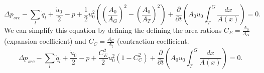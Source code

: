 \documentclass[superscriptaddress, onecolumn, prl]{revtex4}
\begin{document}
\begin{equation}
\label{eq:energy4}
\Delta p_{src} -\sum_l{\dot{q}_l} + \frac{\dot{u}_0}{2} - p + \frac{1}{2} u_{0}^2 \left( \left( \frac{A_{0}}{A_{G}} \right)^2- \left( \frac{A_{0}}{A_{T}} \right)^2 \right) + \frac{\partial}{\partial t} \left( A_{0} u_{0} \int_{T}^{G} \frac{dx}{A(x)} \right) = 0.
\end{equation}
We can simplify this equation by defining the defining the area rations $C_E = \frac{A_{0}}{A_{G}}$ (expansion coefficient) and $C_C = \frac{A_G}{A_t}$ (contraction coefficient.
\begin{equation}
\label{eq:energy5}
\Delta p_{src}-\sum_l{\dot{q}_l} + \frac{\dot{u}_0}{2} - p + \frac{C_E^2}{2} u_{0}^2 \left( 1 - C_C^2 \right) + \frac{\partial}{\partial t} \left( A_{0} u_{0} \int_{T}^{G} \frac{dx}{A(x)} \right) = 0.
\end{equation}
\end{document}
